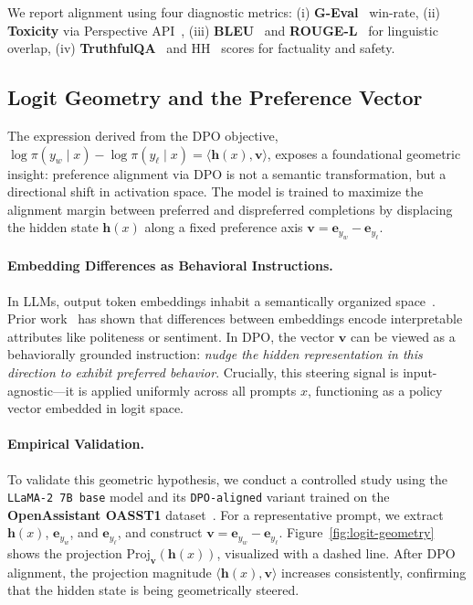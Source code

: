 We report alignment using four diagnostic metrics:
(i) \textbf{G-Eval}~\citep{liu2023geval} win-rate,
(ii) \textbf{Toxicity} via Perspective API~\citep{perspectiveAPI},
(iii) \textbf{BLEU}~\citep{papineni2002bleu} and \textbf{ROUGE-L}~\citep{lin2004rouge} for linguistic overlap,
(iv) \textbf{TruthfulQA}~\citep{lin2021truthfulqa} and HH~\citep{askell2021general} scores for factuality and safety.


\subsection{Logit Geometry and the Preference Vector}
\label{sec:logit-geometry}

The expression derived from the DPO objective, $
\log \pi(y_w \mid x) - \log \pi(y_\ell \mid x) = \langle \mathbf{h}(x), \mathbf{v} \rangle$,  exposes a foundational geometric insight: preference alignment via DPO is not a semantic transformation, but a directional shift in activation space. The model is trained to maximize the alignment margin between preferred and dispreferred completions by displacing the hidden state $\mathbf{h}(x)$ along a fixed preference axis $\mathbf{v} = \mathbf{e}_{y_w} - \mathbf{e}_{y_\ell}$.

\paragraph{Embedding Differences as Behavioral Instructions.}
In LLMs, output token embeddings inhabit a semantically organized space~\cite{mikolov2013efficient}. Prior work~\cite{ethayarajh2019contextual, liu2022probing} has shown that differences between embeddings encode interpretable attributes like politeness or sentiment. In DPO, the vector $\mathbf{v}$ can be viewed as a behaviorally grounded instruction: \emph{nudge the hidden representation in this direction to exhibit preferred behavior}. Crucially, this steering signal is input-agnostic—it is applied uniformly across all prompts $x$, functioning as a policy vector embedded in logit space.

\paragraph{Empirical Validation.}
To validate this geometric hypothesis, we conduct a controlled study using the \texttt{LLaMA-2 7B base} model and its \texttt{DPO-aligned} variant trained on the \textbf{OpenAssistant OASST1} dataset~\cite{kopf2023openassistant}. For a representative prompt, we extract $\mathbf{h}(x)$, $\mathbf{e}_{y_w}$, and $\mathbf{e}_{y_\ell}$, and construct $\mathbf{v} = \mathbf{e}_{y_w} - \mathbf{e}_{y_\ell}$. Figure~\ref{fig:logit-geometry} shows the projection $\mathrm{Proj}_{\mathbf{v}}(\mathbf{h}(x))$, visualized with a dashed line. After DPO alignment, the projection magnitude $\langle \mathbf{h}(x), \mathbf{v} \rangle$ increases consistently, confirming that the hidden state is being geometrically steered.

